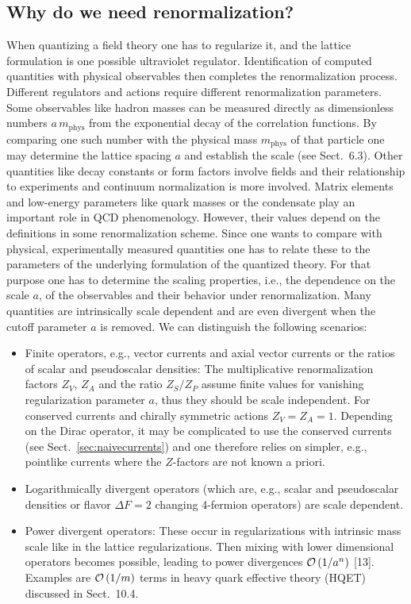 \subsection{Why do we need renormalization?}
When quantizing a field theory one has to regularize it, and the lattice formulation is one possible ultraviolet regulator. Identification of computed quantities with physical observables then completes the renormalization process.
Different regulators and actions require different renormalization parameters.
Some observables like hadron masses can be measured directly as dimensionless numbers $a\,m_{\mathrm{phys}}$ from the exponential decay of the correlation functions. By comparing one such number with the physical mass $m_{\mathrm{phys}}$ of that
particle one may determine the lattice spacing $a$ and establish the scale (see
Sect.~6.3). Other quantities like decay constants or form factors involve fields
and their relationship to experiments and continuum normalization is more
involved.
Matrix elements and low-energy parameters like quark masses or the condensate play an important role in QCD phenomenology. However, their values
depend on the definitions in some renormalization scheme. Since one wants
to compare with physical, experimentally measured quantities one has to relate these to the parameters of the underlying formulation of the quantized
theory. For that purpose one has to determine the scaling properties, i.e., the
dependence on the scale $a$, of the observables and their behavior under renormalization. Many quantities are intrinsically scale dependent and are even
divergent when the cutoff parameter $a$ is removed. We can distinguish the
following scenarios:
\begin{itemize}
\item Finite operators, e.g., vector currents and axial vector currents or the ratios
of scalar and pseudoscalar densities: The multiplicative renormalization
factors $Z_V$, $Z_A$ and the ratio $Z_S/Z_P$ assume finite values for vanishing
regularization parameter $a$, thus they should be scale independent. For
conserved currents and chirally symmetric actions $Z_V = Z_A = 1$. Depending on the Dirac operator, it may be complicated to use the conserved
currents (see Sect.~\ref{sec:naivecurrents}) and one therefore relies on simpler, e.g., pointlike currents where the $Z$-factors are not known a priori.
\item Logarithmically divergent operators (which are, e.g., scalar and pseudoscalar densities or flavor $\Delta F = 2$ changing 4-fermion operators) are
scale dependent.
\item Power divergent operators: These occur in regularizations with intrinsic
mass scale like in the lattice regularizations. Then mixing with lower
dimensional operators becomes possible, leading to power divergences
$\mathcal{O}\left(1/a^n\right)$ [13]. Examples are $\mathcal{O}\left(1/m\right)$ terms in heavy quark effective theory (HQET) discussed in Sect.~10.4.
\end{itemize}

